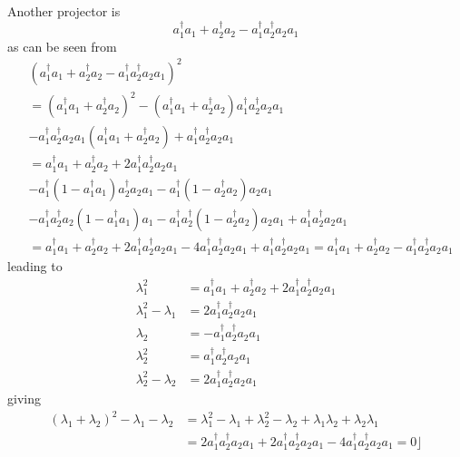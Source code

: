 \documentclass[aps,preprint]{revtex4}%
\begin{document}
Another projector is%
\begin{equation}
a_{1}^{\dagger}a_{1}+a_{2}^{\dagger}a_{2}-a_{1}^{\dagger}a_{2}^{\dagger}%
a_{2}a_{1}%
\end{equation}
as can be seen from%
\begin{align}
&  \left(  a_{1}^{\dagger}a_{1}+a_{2}^{\dagger}a_{2}-a_{1}^{\dagger}%
a_{2}^{\dagger}a_{2}a_{1}\right)  ^{2}\nonumber\\
&  =\left(  a_{1}^{\dagger}a_{1}+a_{2}^{\dagger}a_{2}\right)  ^{2}-\left(
a_{1}^{\dagger}a_{1}+a_{2}^{\dagger}a_{2}\right)  a_{1}^{\dagger}%
a_{2}^{\dagger}a_{2}a_{1}\\
&  -a_{1}^{\dagger}a_{2}^{\dagger}a_{2}a_{1}\left(  a_{1}^{\dagger}a_{1}%
+a_{2}^{\dagger}a_{2}\right)  +a_{1}^{\dagger}a_{2}^{\dagger}a_{2}%
a_{1}\nonumber\\
&  =a_{1}^{\dagger}a_{1}+a_{2}^{\dagger}a_{2}+2a_{1}^{\dagger}a_{2}^{\dagger
}a_{2}a_{1}\nonumber\\
&  -a_{1}^{\dagger}\left(  1-a_{1}^{\dagger}a_{1}\right)  a_{2}^{\dagger}%
a_{2}a_{1}-a_{1}^{\dagger}\left(  1-a_{2}^{\dagger}a_{2}\right)  a_{2}a_{1}\\
&  -a_{1}^{\dagger}a_{2}^{\dagger}a_{2}\left(  1-a_{1}^{\dagger}a_{1}\right)
a_{1}-a_{1}^{\dagger}a_{2}^{\dagger}\left(  1-a_{2}^{\dagger}a_{2}\right)
a_{2}a_{1}+a_{1}^{\dagger}a_{2}^{\dagger}a_{2}a_{1}\nonumber\\
&  =a_{1}^{\dagger}a_{1}+a_{2}^{\dagger}a_{2}+2a_{1}^{\dagger}a_{2}^{\dagger
}a_{2}a_{1}-4a_{1}^{\dagger}a_{2}^{\dagger}a_{2}a_{1}+a_{1}^{\dagger}%
a_{2}^{\dagger}a_{2}a_{1}=a_{1}^{\dagger}a_{1}+a_{2}^{\dagger}a_{2}%
-a_{1}^{\dagger}a_{2}^{\dagger}a_{2}a_{1}%
\end{align}
leading to%
\begin{align}
\lambda_{1}^{2}  &  =a_{1}^{\dagger}a_{1}+a_{2}^{\dagger}a_{2}+2a_{1}%
^{\dagger}a_{2}^{\dagger}a_{2}a_{1}\nonumber\\
\lambda_{1}^{2}-\lambda_{1}  &  =2a_{1}^{\dagger}a_{2}^{\dagger}a_{2}%
a_{1}\nonumber\\
\lambda_{2}  &  =-a_{1}^{\dagger}a_{2}^{\dagger}a_{2}a_{1}\nonumber\\
\lambda_{2}^{2}  &  =a_{1}^{\dagger}a_{2}^{\dagger}a_{2}a_{1}\nonumber\\
\lambda_{2}^{2}-\lambda_{2}  &  =2a_{1}^{\dagger}a_{2}^{\dagger}a_{2}a_{1}%
\end{align}
giving%
\begin{align}
\left(  \lambda_{1}+\lambda_{2}\right)  ^{2}-\lambda_{1}-\lambda_{2}  &
=\lambda_{1}^{2}-\lambda_{1}+\lambda_{2}^{2}-\lambda_{2}+\lambda_{1}%
\lambda_{2}+\lambda_{2}\lambda_{1}\nonumber\\
&  =2a_{1}^{\dagger}a_{2}^{\dagger}a_{2}a_{1}+2a_{1}^{\dagger}a_{2}^{\dagger
}a_{2}a_{1}-4a_{1}^{\dagger}a_{2}^{\dagger}a_{2}a_{1}=0\rfloor
\end{align}
\end{document}
